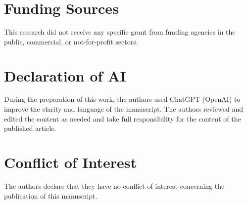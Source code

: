 \documentclass[12pt,a4paper]{article}
\numberwithin{equation}{section}
\begin{document}
\section*{Funding Sources}
This research did not receive any specific grant from funding agencies in the public, commercial, or not-for-profit sectors.
\section*{Declaration of AI}
During the preparation of this work, the authors used ChatGPT (OpenAI) to improve the clarity and language of the manuscript. The authors reviewed and edited the content as needed and take full responsibility for the content of the published article.
\section*{Conflict of Interest}
The authors declare that they have no conflict of interest concerning the publication of this manuscript.
\end{document}

